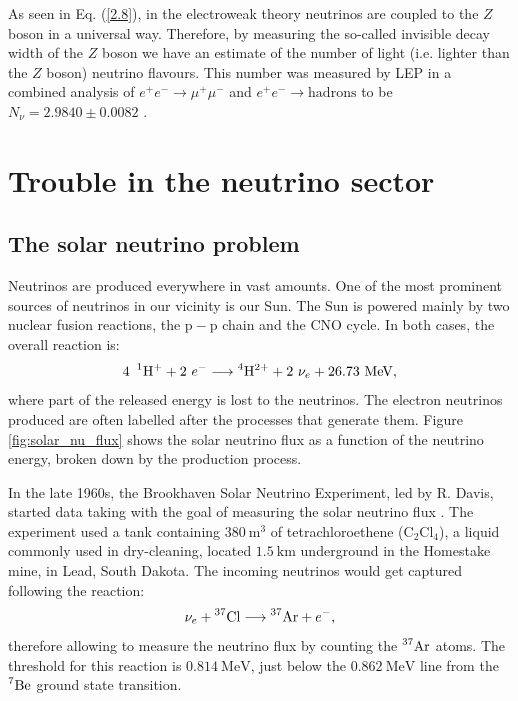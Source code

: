 As seen in Eq. (\ref{2.8}), in the electroweak theory neutrinos are coupled to the $Z$ boson in a universal way. Therefore, by measuring the so-called invisible decay width of the $Z$ boson we have an estimate of the number of light (i.e. lighter than the $Z$ boson) neutrino flavours. This number was measured by LEP in a combined analysis of $e^{+}e^{-} \rightarrow \mu^{+}\mu^{-}$ and $e^{+}e^{-} \rightarrow \mathrm{hadrons}$ to be $N_{\nu} = 2.9840 \pm 0.0082$ \cite{ALEPH2005}.

\section{Trouble in the neutrino sector}

\subsection{The solar neutrino problem}

Neutrinos are produced everywhere in vast amounts. One of the most prominent sources of neutrinos in our vicinity is our Sun. The Sun is powered mainly by two nuclear fusion reactions, the $\mathrm{p}-\mathrm{p}$ chain and the CNO cycle. In both cases, the overall reaction is:
\begin{equation}
	4~\prescript{1}{}{\mathrm{H}}^{+}+2~e^{-} \longrightarrow \prescript{4}{}{\mathrm{H}}^{2+} + 2~\nu_{e} + 26.73~\mathrm{MeV},
\end{equation}
where part of the released energy is lost to the neutrinos. The electron neutrinos produced are often labelled after the processes that generate them. Figure \ref{fig:solar_nu_flux} shows the solar neutrino flux as a function of the neutrino energy, broken down by the production process.

In the late 1960s, the Brookhaven Solar Neutrino Experiment, led by R. Davis, started data taking with the goal of measuring the solar neutrino flux \cite{Davis1968}. The experiment used a tank containing $380~\mathrm{m}^{3}$ of tetrachloroethene ($\mathrm{C}_{2}\mathrm{Cl}_{4}$), a liquid commonly used in dry-cleaning, located $1.5~\mathrm{km}$ underground in the Homestake mine, in Lead, South Dakota. The incoming neutrinos would get captured following the reaction:
\begin{equation}
	\nu_{e} + \prescript{37}{}{\mathrm{Cl}} \longrightarrow \prescript{37}{}{\mathrm{Ar}} + e^{-},
\end{equation}
therefore allowing to measure the neutrino flux by counting the $\prescript{37}{}{\mathrm{Ar}}$ atoms. The threshold for this reaction is $0.814~\mathrm{MeV}$, just below the $0.862~\mathrm{MeV}$ line from the $\prescript{7}{}{\mathrm{Be}}$ ground state transition.

